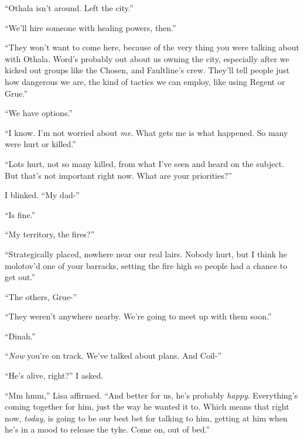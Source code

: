 ``Othala isn't around.  Left the city.''



``We'll hire someone with healing powers, then.''



``They won't want to come here, because of the very thing you were talking about with Othala.  Word's probably out about us owning the city, especially after we kicked out groups like the Chosen, and Faultline's crew.  They'll tell people just how dangerous we are, the kind of tactics we can employ, like using Regent or Grue.''



``We have options.''



``I know.  I'm not worried about \emph{me}.  What gets me is what happened.  So many were hurt or killed.''



``Lots hurt, not so many killed, from what I've seen and heard on the subject.  But that's not important right now.  What are your priorities?''



I blinked.  ``My dad-''



``Is fine.''



``My territory, the fires?''



``Strategically placed, nowhere near our real lairs.  Nobody hurt, but I think he molotov'd one of your barracks, setting the fire high so people had a chance to get out.''



``The others, Grue-''



``They weren't anywhere nearby.  We're going to meet up with them soon.''



``Dinah.''



``\emph{Now} you're on track.  We've talked about plans.  And Coil-''



``He's alive, right?'' I asked.



``Mm hmm,'' Lisa affirmed.  ``And better for us, he's probably \emph{happy}.  Everything's coming together for him, just the way he wanted it to.  Which means that right now, \emph{today}, is going to be our best bet for talking to him, getting at him when he's in a mood to release the tyke.  Come on, out of bed.''



